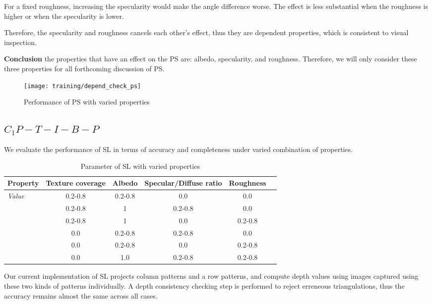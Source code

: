 For a fixed roughness, increasing the specularity would make the angle difference worse. The effect is less substantial when the roughness is higher or when the specularity is lower.

Therefore, the specularity and roughness cancels each other's effect, thus they are dependent properties, which is consistent to visual inspection.

\textbf{Conclusion} the properties that have an effect on the PS are: albedo, specularity, and roughness. Therefore, we will only consider these three properties for all forthcoming discussion of PS.

\begin{figure}[h!]
\texttt{[image: training/depend\_check\_ps]}
\caption{Performance of PS with varied properties}
\label{fig:depend_check_ps}
\end{figure}

\subsection{$C_1P-T-I-B-P$}
We evaluate the performance of SL in terms of accuracy and completeness under varied combination of properties.

\begin{table}[h]
  \centering
  \begin{tabular}{l*{5}{c}}
  \hline
  \textbf{Property} & Texture coverage & Albedo & Specular/Diffuse ratio & Roughness\\
  \hline
  \textit{Value} & 0.2-0.8 & 0.2-0.8 & 0.0 & 0.0\\
                 & 0.2-0.8 & 1 & 0.2-0.8 & 0.0\\
                 & 0.2-0.8 & 1 & 0.0 & 0.2-0.8\\
                 & 0.0 & 0.2-0.8 & 0.2-0.8 & 0.0\\
                 & 0.0 & 0.2-0.8 & 0.0 & 0.2-0.8\\
                 & 0.0 & 1.0 & 0.2-0.8 & 0.2-0.8\\
  \hline
  \end{tabular}
  \caption{Parameter of SL with varied properties}
\end{table}

Our current implementation of SL projects column patterns and a row patterns, and compute depth values using images captured using these two kinds of patterns individually. A depth consistency checking step is performed to reject erreneous triangulations, thus the accuracy remains almost the same across all cases.

